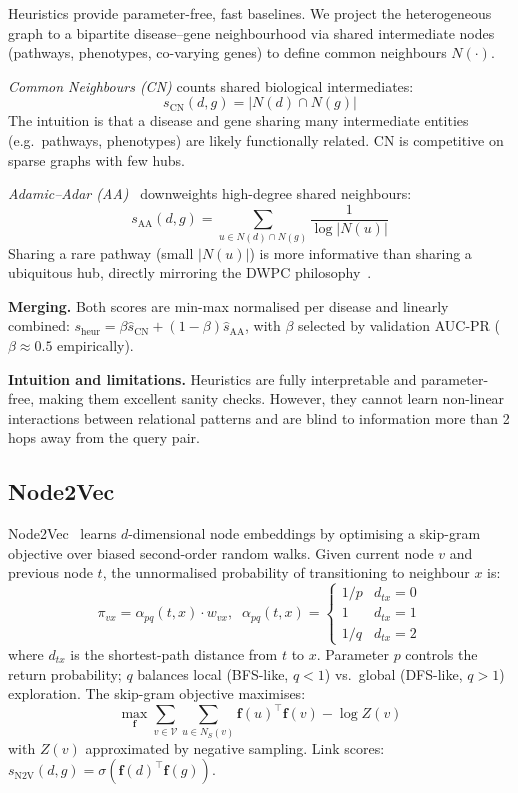 \documentclass[10pt,a4paper,twocolumn]{article}
\DeclareMathOperator{\CN}{CN}
\DeclareMathOperator{\AAd}{AA}
\newcommand{\Vcal}{\mathcal{V}}
\begin{document}
Heuristics provide parameter-free, fast baselines. We project the heterogeneous
graph to a bipartite disease--gene neighbourhood via shared intermediate nodes
(pathways, phenotypes, co-varying genes) to define common neighbours $N(\cdot)$.

\textit{Common Neighbours (CN)} counts shared biological intermediates:
\begin{equation}
s_{\CN}(d,g) = |N(d) \cap N(g)|
\label{eq:cn}
\end{equation}
The intuition is that a disease and gene sharing many intermediate entities
(e.g.\ pathways, phenotypes) are likely functionally related. CN is competitive
on sparse graphs with few hubs.

\textit{Adamic--Adar (AA)}~\citep{adamic2003aa} downweights high-degree shared
neighbours:
\begin{equation}
s_{\AAd}(d,g) = \sum_{u \in N(d) \cap N(g)} \frac{1}{\log |N(u)|}
\label{eq:aa}
\end{equation}
Sharing a rare pathway (small $|N(u)|$) is more informative than sharing a
ubiquitous hub, directly mirroring the DWPC philosophy~\citep{himmelstein2017}.

\textbf{Merging.} Both scores are min-max normalised per disease and linearly
combined: $s_{\text{heur}} = \beta\hat{s}_{\CN} + (1-\beta)\hat{s}_{\AAd}$,
with $\beta$ selected by validation AUC-PR ($\beta\approx0.5$ empirically).

\textbf{Intuition and limitations.} Heuristics are fully interpretable and
parameter-free, making them excellent sanity checks. However, they cannot learn
non-linear interactions between relational patterns and are blind to information
more than 2 hops away from the query pair.

\subsection{Node2Vec}

Node2Vec~\citep{grover2016node2vec} learns $d$-dimensional node embeddings by
optimising a skip-gram objective over biased second-order random walks. Given
current node $v$ and previous node $t$, the unnormalised probability of
transitioning to neighbour $x$ is:
\begin{equation}
\pi_{vx} = \alpha_{pq}(t,x)\cdot w_{vx},\;\;
\alpha_{pq}(t,x) = \begin{cases}
1/p & d_{tx}=0 \\ 1 & d_{tx}=1 \\ 1/q & d_{tx}=2
\end{cases}
\end{equation}
where $d_{tx}$ is the shortest-path distance from $t$ to $x$. Parameter $p$
controls the return probability; $q$ balances local (BFS-like, $q<1$) vs.\
global (DFS-like, $q>1$) exploration. The skip-gram objective maximises:
\begin{equation}
\max_\mathbf{f} \sum_{v\in\Vcal}\sum_{u\in N_S(v)} \mathbf{f}(u)^\top\mathbf{f}(v) - \log Z(v)
\end{equation}
with $Z(v)$ approximated by negative sampling. Link scores:
$s_{\text{N2V}}(d,g) = \sigma(\mathbf{f}(d)^\top\mathbf{f}(g))$.
\end{document}
